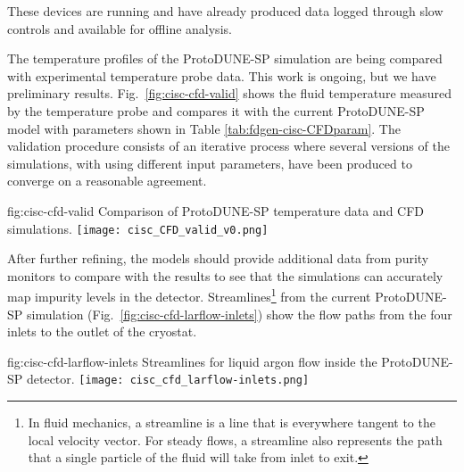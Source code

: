 
These devices are running and have already produced data logged through slow controls and available for offline analysis.

The temperature profiles of the ProtoDUNE-SP  simulation are being compared with experimental temperature probe data. This work is ongoing, but we have preliminary results. Fig.~\ref{fig:cisc-cfd-valid} shows the fluid temperature measured by the temperature probe and compares it with the current ProtoDUNE-SP  model with parameters shown in Table \ref{tab:fdgen-cisc-CFDparam}. 
The validation procedure consists of an iterative process where several versions of the  simulations, with using different input parameters, have been produced to converge on a reasonable agreement. 

\begin{dunefigure}{fig:cisc-cfd-valid}
  {Comparison of ProtoDUNE-SP temperature data and CFD simulations.}
  \texttt{[image: cisc\_CFD\_valid\_v0.png]}
\end{dunefigure}

After further refining, the  models should provide additional data from purity monitors to compare with the results to see that the simulations can accurately map impurity levels in the detector. Streamlines\footnote{In fluid mechanics, a streamline is a line that is everywhere tangent to the local velocity vector. For steady flows, a streamline also represents the path that a single particle of the fluid will take from inlet to exit.} from the current ProtoDUNE-SP simulation (Fig.~\ref{fig:cisc-cfd-larflow-inlets}) show the flow paths from the four inlets to the outlet of the cryostat.

\begin{dunefigure}{fig:cisc-cfd-larflow-inlets}
  {Streamlines for liquid argon flow inside the ProtoDUNE-SP detector.}
  \texttt{[image: cisc\_cfd\_larflow-inlets.png]}
\end{dunefigure}


